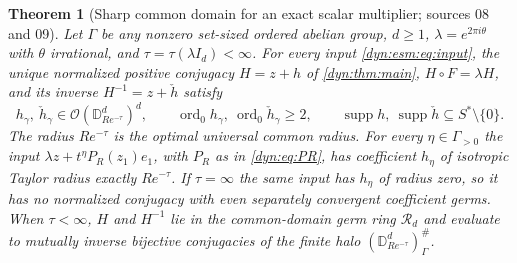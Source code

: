 \documentclass[11pt,letterpaper]{article}
\newtheorem{theorem}{Theorem}[section]
\theoremstyle{definition}
\theoremstyle{remark}
\newcommand{\OO}{\mathcal O}
\newcommand{\supp}{\operatorname{supp}}
\newcommand{\ord}{\operatorname{ord}}
\numberwithin{equation}{section}
\begin{document}
\begin{theorem}[Sharp common domain for an exact scalar multiplier; sources
08 and 09]\label{dyn:esm:thm:main}
Let $\Gamma$ be any nonzero set-sized ordered abelian group, $d\ge1$,
$\lambda=e^{2\pi i\theta}$ with $\theta$ irrational, and
$\tau=\tau(\lambda I_d)<\infty$. For every input \eqref{dyn:esm:eq:input},
the unique normalized positive conjugacy $H=z+h$ of \cref{dyn:thm:main},
$H\circ F=\lambda H$, and its inverse $H^{-1}=z+\check h$ satisfy
\begin{equation}\label{dyn:esm:eq:main}
 h_\gamma,\ \check h_\gamma\in\OO(\mathbb D^{d}_{Re^{-\tau}})^{d},\qquad
 \ord_0h_\gamma,\ \ord_0\check h_\gamma\ge2,\qquad
 \supp h,\ \supp\check h\subseteq S^{*}\setminus\{0\}.
\end{equation}
The radius $Re^{-\tau}$ is the optimal universal common radius. For every
$\eta\in\Gamma_{>0}$ the input $\lambda z+t^{\eta}P_R(z_1)e_1$, with $P_R$ as
in \eqref{dyn:eq:PR}, has coefficient $h_\eta$ of isotropic Taylor radius
exactly $Re^{-\tau}$. If $\tau=\infty$ the same input has $h_\eta$ of radius
zero, so it has no normalized conjugacy with even separately convergent
coefficient germs. When $\tau<\infty$, $H$ and $H^{-1}$ lie in the
common-domain germ ring $\mathcal R_d$ and evaluate to mutually inverse
bijective conjugacies of the finite halo $(\mathbb D^{d}_{Re^{-\tau}})^{\#}_\Gamma$.
\end{theorem}
\end{document}
